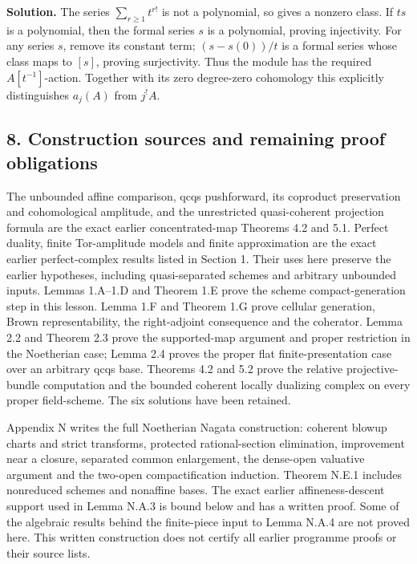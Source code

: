 \documentclass[11pt]{article}
\begin{document}
\textbf{Solution.} The series \(\sum_{r\geq1}t^{r!}\) is not a
polynomial, so gives a nonzero class. If \(ts\) is a polynomial, then
the formal series \(s\) is a polynomial, proving injectivity. For any
series \(s\), remove its constant term; \((s-s(0))/t\) is a formal
series whose class maps to \([s]\), proving surjectivity. Thus the
module has the required \(A[t^{-1}]\)-action. Together with its zero
degree-zero cohomology this explicitly distinguishes \(a_j(A)\) from
\(j^!A\).

\subsection{8. Construction sources and remaining proof
obligations}\label{construction-sources-and-remaining-proof-obligations}

The unbounded affine comparison, qcqs pushforward, its coproduct
preservation and cohomological amplitude, and the unrestricted
quasi-coherent projection formula are the exact earlier concentrated-map
Theorems 4.2 and 5.1. Perfect duality, finite Tor-amplitude models and
finite approximation are the exact earlier perfect-complex results
listed in Section 1. Their uses here preserve the earlier hypotheses,
including quasi-separated schemes and arbitrary unbounded inputs. Lemmas
1.A--1.D and Theorem 1.E prove the scheme compact-generation step in
this lesson. Lemma 1.F and Theorem 1.G prove cellular generation, Brown
representability, the right-adjoint consequence and the coherator. Lemma
2.2 and Theorem 2.3 prove the supported-map argument and proper
restriction in the Noetherian case; Lemma 2.4 proves the proper flat
finite-presentation case over an arbitrary qcqs base. Theorems 4.2 and
5.2 prove the relative projective-bundle computation and the bounded
coherent locally dualizing complex on every proper field-scheme. The six
solutions have been retained.

Appendix N writes the full Noetherian Nagata construction: coherent
blowup charts and strict transforms, protected rational-section
elimination, improvement near a closure, separated common enlargement,
the dense-open valuative argument and the two-open compactification
induction. Theorem N.E.1 includes nonreduced schemes and nonaffine
bases. The exact earlier affineness-descent support used in Lemma N.A.3
is bound below and has a written proof. Some of the algebraic results
behind the finite-piece input to Lemma N.A.4 are not proved here. This
written construction does not certify all earlier programme proofs or
their source lists.
\end{document}
